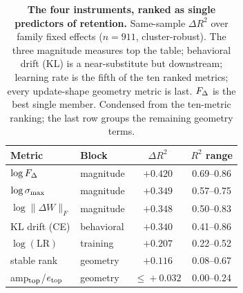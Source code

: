 \begin{table}[t]
\centering
\footnotesize
\setlength{\tabcolsep}{4pt}
\caption{\textbf{The four instruments, ranked as single predictors of
retention.} Same-sample $\Delta R^2$ over family fixed effects
($n\!=\!911$, cluster-robust). The three magnitude measures top the table;
behavioral drift (KL) is a near-substitute but downstream; learning rate is the
fifth of the ten ranked metrics; every update-shape geometry metric is last.
$F_{\Delta}$ is the best single member. Condensed from the ten-metric ranking; the last
row groups the remaining geometry terms.}
\label{tab:league}
\begin{tabular}{l l c c}
\toprule
Metric & Block & $\Delta R^2$ & $R^2$ range \\
\midrule
$\log F_{\Delta}$              & magnitude  & $+0.420$ & 0.69--0.86 \\
$\log\sigma_{\max}$            & magnitude  & $+0.349$ & 0.57--0.75 \\
$\log\lVert\Delta W\rVert_F$ & magnitude & $+0.348$ & 0.50--0.83 \\
KL drift (CE)          & behavioral & $+0.340$ & 0.41--0.86 \\
$\log(\text{LR})$      & training   & $+0.207$ & 0.22--0.52 \\
stable rank            & geometry   & $+0.116$ & 0.08--0.67 \\
amp$_{\rm top}$/$e_{\rm top}$ & geometry & $\le\!+0.032$ & 0.00--0.24 \\
\bottomrule
\end{tabular}
\end{table}
